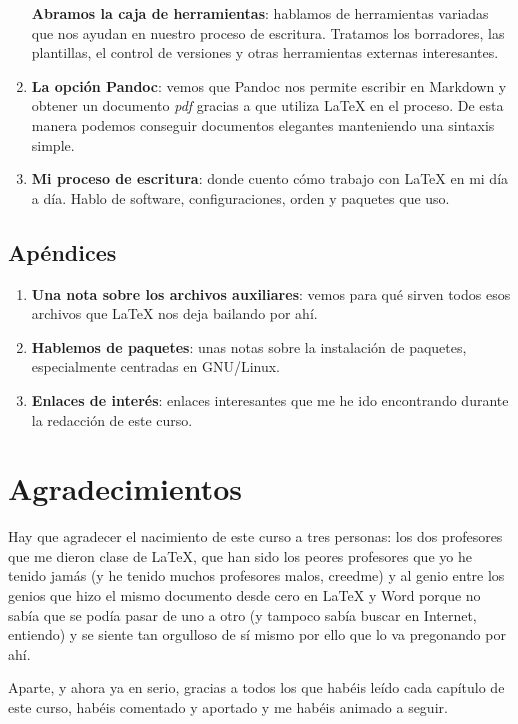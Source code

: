 \begin{enumerate}
  \textbf{Abramos la caja de herramientas}: hablamos de herramientas
  variadas que nos ayudan en nuestro proceso de escritura. Tratamos los
  borradores, las plantillas, el control de versiones y otras
  herramientas externas interesantes.
\item 
  \textbf{La opción Pandoc}: vemos que Pandoc nos permite escribir en
  Markdown y obtener un documento \emph{pdf} gracias a que utiliza LaTeX
  en el proceso. De esta manera podemos conseguir documentos
  elegantes manteniendo una sintaxis simple.
\item
  \textbf{Mi proceso de escritura}: donde cuento cómo trabajo con LaTeX
  en mi día a día. Hablo de software, configuraciones, orden y paquetes 
  que uso.
\end{enumerate}

\subsection*{Apéndices}

\begin{enumerate}
\item
  \textbf{Una nota sobre los archivos auxiliares}: vemos para qué sirven
  todos esos archivos que LaTeX nos deja bailando por ahí.
\item
  \textbf{Hablemos de paquetes}: unas notas sobre la instalación de
  paquetes, especialmente centradas en GNU/Linux.
\item
  \textbf{Enlaces de interés}: enlaces interesantes que me he ido
   encontrando durante la redacción de este curso.
\end{enumerate}

\section*{Agradecimientos}\label{sec:agradecimientos}

Hay que agradecer el nacimiento de este curso a tres personas: los dos
profesores que me dieron clase de LaTeX, que han sido los peores
profesores que yo he tenido jamás (y he tenido muchos profesores malos,
creedme) y al genio entre los genios que hizo el mismo documento desde
cero en LaTeX y Word porque no sabía que se podía pasar de uno a otro (y
tampoco sabía buscar en Internet, entiendo) y se siente tan orgulloso de
sí mismo por ello que lo va pregonando por ahí.

Aparte, y ahora ya en serio, gracias a todos los que habéis leído cada
capítulo de este curso, habéis comentado y aportado y me habéis animado
a seguir.
